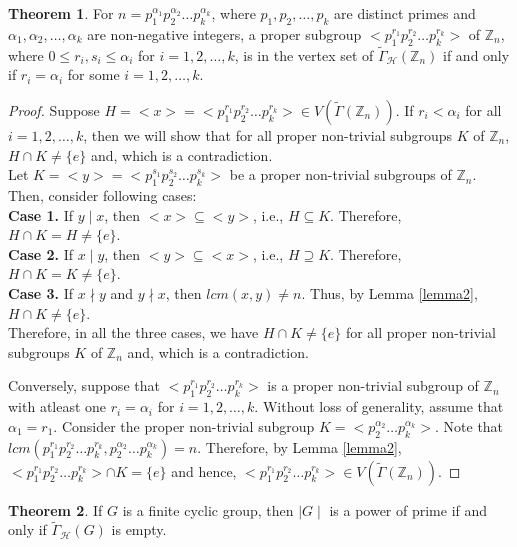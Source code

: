 \documentclass[11pt,a4paper]{article}
\theoremstyle{definition}
\newtheorem{theorem}{Theorem}[section]
\theoremstyle{remark}
\begin{document}
	\begin{theorem}\label{vertexset}
		For $n=p_1^{\alpha_1}p_2^{\alpha_2}\ldots p_k^{\alpha_k}$, where $p_1,p_2, \ldots,p_k$ are distinct primes and $\alpha_1,\alpha_2,\ldots,\alpha_k$ are non-negative integers, a proper subgroup $<p_1^{r_1}p_2^{r_2}\ldots p_k^{r_k}>$ of $\mathbb{Z}_n$, where $0 \leq r_i,s_i \leq \alpha_i$ for $i=1,2, \ldots, k$, is in the vertex set of $\tilde{\Gamma}_\mathcal{H}(\mathbb{Z}_n)$ if and only if  $r_i = \alpha_i $ for some $i= 1,2, \ldots, k$.
	\end{theorem}
	\begin{proof}
		Suppose  $H=<x>=<p_1^{r_1}p_2^{r_2}\ldots p_k^{r_k}> \in V(\tilde{\Gamma}(\mathbb{Z}_n))$. If $r_i < \alpha_i$ for all $i=1,2, \ldots, k$, then we will show that for all proper non-trivial subgroups $K$ of $\mathbb{Z}_n$, $H \cap K \neq \{e\}$ and, which is a contradiction.\\
		Let $K=<y>=<p_1^{s_1}p_2^{s_2}\ldots p_k^{s_k}>$ be a proper non-trivial subgroups of $\mathbb{Z}_n$. Then, consider  following cases:\\
		\textbf{Case 1.} If $y \mid x$, then  $<x> \subseteq <y>$, i.e., $H \subseteq K$. Therefore, $H \cap K = H \neq \{e\}$.\\
			\textbf{Case 2.} If $x \mid y$, then  $<y> \subseteq <x>$, i.e., $H \supseteq K$. Therefore, $H \cap K = K \neq \{e\}$.\\
			\textbf{Case 3.} If $x \nmid y$ and $y \nmid x$, then $lcm(x,y)\neq n$. Thus, by Lemma \ref{lemma2}, $H \cap K  \neq \{e\}$.\\
			Therefore, in all the three cases, we have $H \cap K \neq \{e\}$ for all proper non-trivial subgroups $K$ of $\mathbb{Z}_n$ and, which is a contradiction.
			
			Conversely, suppose that $<p_1^{r_1}p_2^{r_2}\ldots p_k^{r_k}>$ is a proper non-trivial subgroup of $\mathbb{Z}_n$ with atleast one $r_i = \alpha_i$ for $i=1,2, \ldots, k$. Without loss of generality, assume that $\alpha_1=r_1$. Consider the proper non-trivial subgroup $K=<p_2^{\alpha_2}\ldots p_k^{\alpha_k}>$. Note that $lcm(p_1^{r_1}p_2^{r_2}\ldots p_k^{r_k}, p_2^{\alpha_2}\ldots p_k^{\alpha_k})=n$. Therefore, by Lemma \ref{lemma2}, $ <p_1^{r_1}p_2^{r_2}\ldots p_k^{r_k}>\cap K=\{e\}$ and hence,  $<p_1^{r_1}p_2^{r_2}\ldots p_k^{r_k}> \in  V(\tilde{\Gamma}(\mathbb{Z}_n))$. 
	\end{proof}
	\begin{theorem}
		If $G$ is a finite cyclic group, then $\mid G \mid$ is a power of prime if and only if $\tilde{\Gamma}_\mathcal{H}(G)$ is empty.
	\end{theorem}
\end{document}
